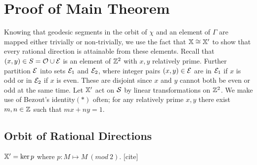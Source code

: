 \documentclass[]{article}
\begin{document}
\section{Proof of Main Theorem}
Knowing that geodesic segments in the orbit of $\chi$ and an element of $\Gamma$ are mapped either trivially or non-trivially, we use the fact that $\mathbb{X}\cong\mathbb{X}'$ to show that every rational direction is attainable from these elements. Recall that $(x,y)\in S=\mathcal{O}\cup \mathcal{E}$ is an element of $\mathbb{Z}^2$ with $x,y$ relatively prime. Further partition $\mathcal{E}$ into sets $\mathcal{E}_1$ and $\mathcal{E}_2$, where integer pairs $(x,y)\in\mathcal{E}$ are in $\mathcal{E}_1$ if $x$ is odd or in $\mathcal{E}_2$ if $x$ is even. These are disjoint since $x$ and $y$ cannot both be even or odd at the same time. Let $\mathbb{X}'$ act on $\mathcal{S}$ by linear transformations on $\mathbb{Z}^2$. We make use of Bezout's identity$(*)$ often; for any relatively prime $x,y$ there exist $m,n\in\mathbb{Z}$ such that $mx+ny=1$.

\subsection{Orbit of Rational Directions}

\begin{lem}
$\mathbb{X}'=\ker p$ where $p:M\mapsto M~(mod~2)$. [cite]
\end{lem}
\end{document}
